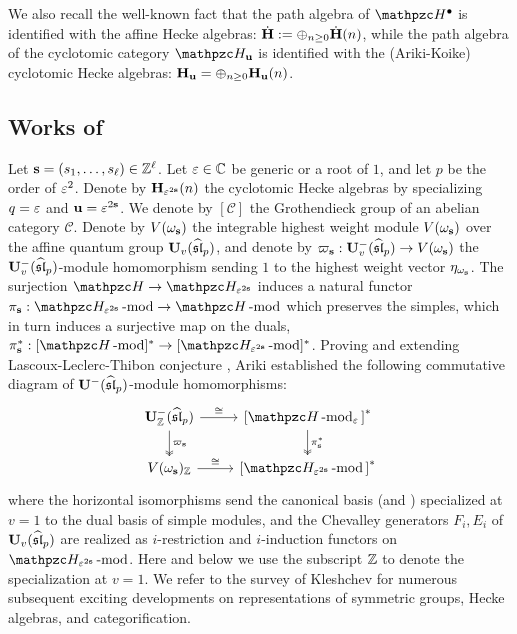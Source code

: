 We also recall the well-known fact that the path algebra of $\qAH$ is identified with the affine Hecke algebras: $\dot{\bf H} :=\oplus_{n\ge 0} \dot{\bf H}(n)$, while the path algebra of the cyclotomic category $\qH_\bfu$ is identified with the (Ariki-Koike) cyclotomic Hecke algebras: $\mathbf{H}_{\mathbf{u}} =\oplus_{n\ge 0} \mathbf{H}_{\mathbf{u}}(n)$.




\subsection{Works of \cite{LLT96, Ar96, LT96, VV99} }

Let $\mathbf{s}=(s_1,\ldots, s_\ell)\in \mathbb{Z}^\ell$. Let $\varepsilon \in \mathbb{C}$ be generic or a root of $1$, and let $p$ be the order of $\varepsilon^2$. Denote by $\mathbf{H}_{\varepsilon^{2\mathbf{s}}}(n)$ the cyclotomic Hecke algebras by specializing $q=\varepsilon$ and $\mathbf{u}=\varepsilon^{2\mathbf{s}}$. We denote by $[\mathcal C]$ the Grothendieck group of an abelian category $\mathcal C$. Denote by $V(\omega_{\mathbf{s}})$ the integrable highest weight module $V(\omega_{\mathbf{s}})$ over the affine quantum group $\bold{U}_v(\widehat{\mathfrak{sl}}_p)$, and denote by $\varpi_{\mathbf{s}}: \bold{U}^-_v(\widehat{\mathfrak{sl}}_p) \rightarrow V(\omega_{\mathbf{s}})$ the $\bold{U}^-_v(\widehat{\mathfrak{sl}}_p)$-module homomorphism sending $1$ to the highest weight vector $\eta_{\omega_{\mathbf{s}}}$. The surjection $\qH \rightarrow \qH_{\eps^{2\bfs}}$ induces a natural functor $\pi_\bfs: \qH_{\eps^{2\bfs}}\modf \rightarrow \qH\modf$ which preserves the simples, which in turn induces a surjective map on the duals, $\pi_\bfs^*: [\qH\modf]^* \rightarrow [\qH_{\eps^{2\bfs}}\modf]^*$. Proving and extending Lascoux-Leclerc-Thibon conjecture \cite{LLT96}, Ariki \cite{Ar96} established the following commutative diagram of $\bold{U}^-(\widehat{\mathfrak{sl}}_p)$-module homomorphisms: 
\begin{equation}  
\label{eq:Ariki}
\begin{tikzcd}
\U^-_\Z(\widehat\sll_p) \ar[r,"\cong"]\ar[d,two heads,"\varpi_\bfs"]&{[}\qH\modf_\eps{]}^* \ar[d,two heads,"\pi_\bfs^*"]\\
V(\omega_\bfs)_\Z  \ar[r,"\cong"]&{[} \qH_{\eps^{2\bfs}}\modf{]}^* 
\end{tikzcd} 
\end{equation}
where the horizontal isomorphisms send the canonical basis \cite{Lus90, Lus91} (and \cite{Kas91}) specialized at $v=1$ to the dual basis of simple modules, and the Chevalley generators $F_i, E_i$ of $\bold{U}_v(\widehat{\mathfrak{sl}}_p)$ are realized as $i$-restriction and $i$-induction functors on $\qH_{\eps^{2\bfs}}\modf$. Here and below we use the subscript $\mathbb{Z}$ to denote the specialization at $v=1$. We refer to the survey of Kleshchev \cite{Kle10} for numerous subsequent exciting developments on representations of symmetric groups, Hecke algebras, and categorification.


